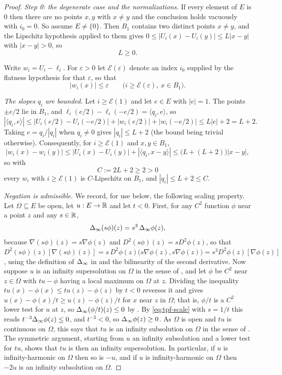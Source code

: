 \begin{proof}
\emph{Step 0: the degenerate case and the normalizations.}
If every element of $E$ is $0$ then there are no points $x,y$ with $x\ne y$ and
the conclusion holds vacuously with $i_0=0$. So assume $E\ne\{0\}$. Then $B_1$
contains two distinct points $x\ne y$, and the Lipschitz hypothesis applied to
them gives $0\le|U_i(x)-U_i(y)|\le L|x-y|$ with $|x-y|>0$, so
\[
  L\ge0 .
\]

Write $w_i=U_i-\ell_i$. For $\varepsilon>0$ let $\mathcal E(\varepsilon)$ denote
an index $i_0$ supplied by the flatness hypothesis for that $\varepsilon$, so
that
\[
  |w_i(x)|\le\varepsilon\qquad\bigl(i\ge\mathcal E(\varepsilon),\ x\in B_1\bigr).
\]

\emph{The slopes $q_i$ are bounded.} Let $i\ge\mathcal E(1)$ and let $e\in E$
with $|e|=1$. The points $\pm e/2$ lie in $B_1$, and
$\ell_i(e/2)-\ell_i(-e/2)=\langle q_i,e\rangle$, so
\[
  |\langle q_i,e\rangle|
   \le\bigl|U_i(e/2)-U_i(-e/2)\bigr|+|w_i(e/2)|+|w_i(-e/2)|
   \le L|e|+2=L+2 .
\]
Taking $e=q_i/|q_i|$ when $q_i\ne0$ gives $|q_i|\le L+2$ (the bound being
trivial otherwise). Consequently, for $i\ge\mathcal E(1)$ and $x,y\in B_1$,
\[
  |w_i(x)-w_i(y)|\le|U_i(x)-U_i(y)|+|\langle q_i,x-y\rangle|
   \le\bigl(L+(L+2)\bigr)|x-y|,
\]
so with
\[
  C:=2L+2\ge2>0
\]
every $w_i$ with $i\ge\mathcal E(1)$ is $C$-Lipschitz on $B_1$, and
$|q_i|\le L+2\le C$.

\emph{Negation is admissible.} We record, for use below, the following scaling
property. Let $\Omega\subseteq E$ be open, let $u:E\to\mathbb{R}$ and let $t<0$. First,
for any $C^2$ function $\phi$ near a point $z$ and any $s\in\mathbb{R}$,
\begin{equation}\label{eq:tpf-scale}
  \Delta_{\infty}(s\phi)(z)=s^3\,\Delta_{\infty}\phi(z),
\end{equation}
because $\nabla(s\phi)(z)=s\nabla\phi(z)$ and $D^2(s\phi)(z)=sD^2\phi(z)$, so
that $D^2(s\phi)(z)[\nabla(s\phi)(z)]
=s\,D^2\phi(z)\bigl(s\nabla\phi(z),s\nabla\phi(z)\bigr)=s^3D^2\phi(z)[\nabla\phi(z)]$,
using the definition of $\Delta_{\infty}$ in  and the bilinearity of the
second derivative. Now suppose $u$ is an infinity supersolution on $\Omega$ in
the sense of , and let $\phi$ be $C^2$ near
$z\in\Omega$ with $tu-\phi$ having a local maximum on $\Omega$ at $z$. Dividing
the inequality $tu(x)-\phi(x)\le tu(z)-\phi(z)$ by $t<0$ reverses it and gives
$u(x)-\phi(x)/t\ge u(z)-\phi(z)/t$ for $x$ near $z$ in $\Omega$; that is,
$\phi/t$ is a $C^2$ lower test for $u$ at $z$, so $\Delta_{\infty}(\phi/t)(z)\le0$ by
. By \eqref{eq:tpf-scale} with $s=1/t$ this reads
$t^{-3}\Delta_{\infty}\phi(z)\le0$, and $t^{-3}<0$, so $\Delta_{\infty}\phi(z)\ge0$. As $\Omega$ is
open and $tu$ is continuous on $\Omega$, this says that $tu$ is an infinity
subsolution on $\Omega$ in the sense of . The
symmetric argument, starting from $u$ an infinity subsolution and a lower test
for $tu$, shows that $tu$ is then an infinity supersolution. In particular, if
$u$ is infinity-harmonic on $\Omega$ then so is $-u$, and if $u$ is
infinity-harmonic on $\Omega$ then $-2u$ is an infinity subsolution on $\Omega$.


\end{proof}
